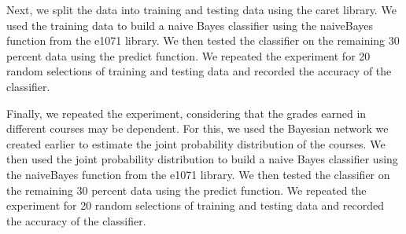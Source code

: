 \documentclass[15pt,journal]{IEEEtran}
\begin{document}
Next, we split the data into training and testing data using the caret library. We used the training data to build a naive Bayes classifier using the naiveBayes function from the e1071 library. We then tested the classifier on the remaining 30 percent data using the predict function. We repeated the experiment for 20 random selections of training and testing data and recorded the accuracy of the classifier.

Finally, we repeated the experiment, considering that the grades earned in different courses may be dependent. For this, we used the Bayesian network we created earlier to estimate the joint probability distribution of the courses. We then used the joint probability distribution to build a naive Bayes classifier using the naiveBayes function from the e1071 library. We then tested the classifier on the remaining 30 percent data using the predict function. We repeated the experiment for 20 random selections of training and testing data and recorded the accuracy of the classifier.
\end{document}
